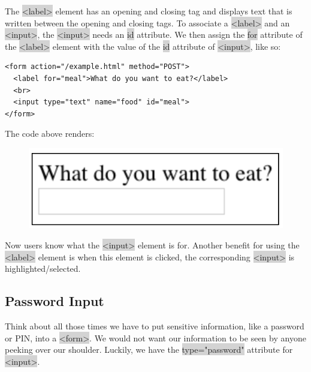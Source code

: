 \documentclass[11pt]{article}
\begin{document}
The \colorbox{lightgray}{<label>} element has an opening and closing tag and displays text that is written between the opening and closing tags. To associate a \colorbox{lightgray}{<label>} and an \colorbox{lightgray}{<input>}, the \colorbox{lightgray}{<input>} needs an \colorbox{lightgray}{id} attribute. We then assign the \colorbox{lightgray}{for} attribute of the \colorbox{lightgray}{<label>} element with the value of the \colorbox{lightgray}{id} attribute of \colorbox{lightgray}{<input>}, like so:
\begin{lstlisting}
<form action="/example.html" method="POST">
  <label for="meal">What do you want to eat?</label>
  <br>
  <input type="text" name="food" id="meal">
</form>
\end{lstlisting}
The code above renders:
\begin{figure}[H]
\includegraphics[scale = 0.5]{3_5}
\centering
\end{figure}
\vspace{-4mm}
Now users know what the \colorbox{lightgray}{<input>} element is for. Another benefit for using the \colorbox{lightgray}{<label>} element is when this element is clicked, the corresponding \colorbox{lightgray}{<input>} is highlighted/selected.

\subsection{Password Input}
Think about all those times we have to put sensitive information, like a password or PIN, into a \colorbox{lightgray}{<form>}. We would not want our information to be seen by anyone peeking over our shoulder. Luckily, we have the \colorbox{lightgray}{type="password"} attribute for \colorbox{lightgray}{<input>}.
\end{document}
